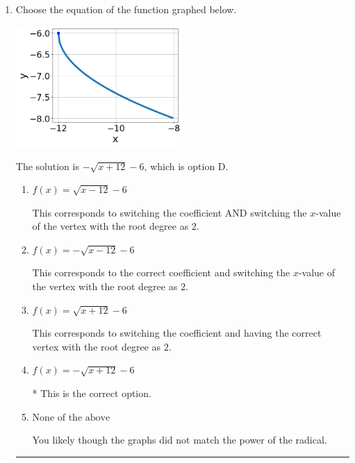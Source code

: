 \documentclass{extbook}[14pt]
\newcommand{\litem}[1]{\item #1

\rule{\textwidth}{0.4pt}}
\begin{document}
\begin{enumerate}\litem{
Choose the equation of the function graphed below.

\begin{center}
    \includegraphics[width=0.5\textwidth]{../Figures/radicalGraphToEquationCopyC.png}
\end{center}


The solution is \( - \sqrt{x + 12} - 6 \), which is option D.\begin{enumerate}[label=\Alph*.]
\item \( f(x) = \sqrt{x - 12} - 6 \)

This corresponds to switching the coefficient AND switching the $x$-value of the vertex with the root degree as $2$.
\item \( f(x) = - \sqrt{x - 12} - 6 \)

This corresponds to the correct coefficient and switching the $x$-value of the vertex with the root degree as $2$.
\item \( f(x) = \sqrt{x + 12} - 6 \)

This corresponds to switching the coefficient and having the correct vertex with the root degree as $2$.
\item \( f(x) = - \sqrt{x + 12} - 6 \)

* This is the correct option.
\item \( \text{None of the above} \)

You likely though the graphs did not match the power of the radical.
\end{enumerate}

}
\end{enumerate}
\end{document}
